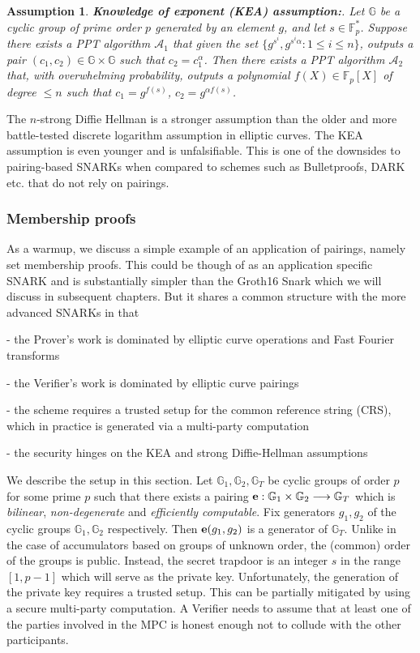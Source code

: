 \documentclass[a4paper, 11pt]{scrreprt}
\newtheorem{Ass}{Assumption}[section]
\numberwithin{equation}{section}
\newcommand{\bFp}{\mathbb{F}_p}
\newcommand{\lra}{\longrightarrow}
\newcommand{\mc}{\mathcal}
\newcommand{\mb}{\mathbb}
\newcommand{\al}{\alpha}
\newcommand{\noin}{\noindent}
\theoremstyle{plain}
\begin{document}
\begin{Ass} {\normalfont \textbf{{Knowledge of exponent (KEA) assumption:}}}. Let $\mb{G}$ be a cyclic group of prime order $p$ generated by an element $g$, and let $s \in \bFp^*$. Suppose there exists a PPT algorithm $\mc{A}_1$ that given the set $\{g^{s^i}, g^{s^i\al}: 1\leq i\leq n \}$, outputs a pair $(c_1, c_2)\in \mb{G}\times\mb{G}$ such that $c_2 = c_1^{\al}$. Then there exists a PPT algorithm $\mc{A}_2$ that, with overwhelming probability, outputs a polynomial $f(X)\in \bFp[X]$ of degree $\leq n$ such that $c_1 = g^{f(s)}$, $c_2 = g^{\al f(s)}$.\end{Ass}

The $n$-strong Diffie Hellman is a stronger assumption than the older and more battle-tested discrete logarithm assumption in elliptic curves. The KEA assumption is even younger and is unfalsifiable. This is one of the downsides to pairing-based SNARKs when compared to schemes such as Bulletproofs, DARK etc. that do not rely on pairings.

\subsubsection{\fontsize{11}{11}\selectfont Membership proofs}


As a warmup, we discuss a simple example of an application of pairings, namely set membership proofs. This could be though of as an application specific SNARK and is substantially simpler than the Groth16 Snark which we will discuss in subsequent chapters. But it shares a common structure with the more advanced SNARKs in that 

\noin - the Prover's work is dominated by elliptic curve operations and Fast Fourier transforms

\noin - the Verifier's work is dominated by elliptic curve pairings

\noin - the scheme requires a trusted setup for the common reference string (CRS), which in practice is generated via a multi-party computation

\noin - the security hinges on the KEA and strong Diffie-Hellman assumptions

We describe the setup in this section. Let $\mb{G}_1, \mb{G}_2, \mb{G}_T$ be cyclic groups of order $p$ for some prime $p$ such that there exists a pairing ${\bf{e}}:\mb{G}_1\times \mb{G}_2\lra \mb{G}_T$ which is \textit{bilinear}, \textit{non-degenerate} and \textit{efficiently computable}. Fix generators $g_1, g_2$ of the cyclic groups $\mb{G}_1, \mb{G}_2$ respectively. Then ${\bf{e}}(g_1,g_2)$ is a generator of $\mb{G}_T$. Unlike in the case of accumulators based on groups of unknown order, the (common) order of the groups is public. Instead, the secret trapdoor is an integer $s$ in the range $[1, p-1]$ which will serve as the private key. Unfortunately, the generation of the private key requires a trusted setup. This can be partially mitigated by using a secure multi-party computation. A Verifier needs to assume that at least one of the parties involved in the MPC is honest enough not to collude with the other participants. 
\end{document}
